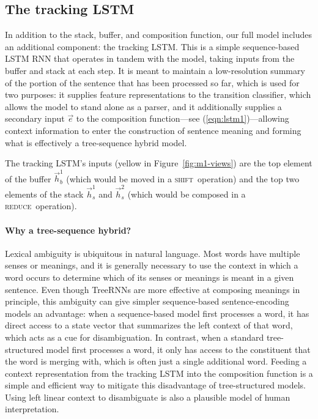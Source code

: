 \documentclass[11pt]{article}
\newcommand{\shift}{\textsc{shift}}
\newcommand{\reduce}{\textsc{reduce}}
\begin{document}
\subsection{The tracking LSTM}\label{sec:tracking}

In addition to the stack, buffer, and composition function, our full model includes an additional component: the tracking LSTM. This is a simple sequence-based LSTM RNN that operates in tandem with the model, taking inputs from the buffer and stack at each step. It is meant to maintain a low-resolution summary of the portion of the sentence that has been processed so far, which is used for two purposes: it supplies feature representations to the transition classifier, which allows the model to stand alone as a parser, and it additionally supplies a secondary input $\vec{e}$ to the composition function---see (\ref{eqn:lstm1})---allowing context information to enter the construction of sentence meaning and forming what is effectively a tree-sequence hybrid model.

The tracking LSTM's inputs (yellow in Figure~\ref{fig:m1-views}) are the top element of the buffer $\vec{h}_b^1$ (which would be moved in a \shift\ operation) and the top two elements of the stack $\vec{h}_s^1$ and $\vec{h}_s^2$ (which would be composed in a \reduce\ operation).

\paragraph{Why a tree-sequence hybrid?}

Lexical ambiguity is ubiquitous in natural language. Most words have multiple senses or meanings, and it is generally necessary to use the context in which a word occurs to determine which of its senses or meanings is meant in a given sentence. Even though TreeRNNs are more effective at composing meanings in principle, this ambiguity can give simpler sequence-based sentence-encoding models an advantage: when a sequence-based model first processes a word, it has direct access to a state vector that summarizes the left context of that word, which acts as a cue for disambiguation. In contrast, when a standard tree-structured model first processes a word, it only has access to the constituent that the word is merging with, which is often just a single additional word. Feeding a context representation from the tracking LSTM into the composition function is a simple and efficient way to mitigate this disadvantage of tree-structured models. Using left linear context to disambiguate is also a plausible model of human interpretation.
\end{document}
